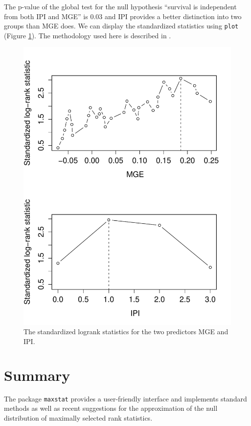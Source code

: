 \documentclass{article}
\begin{document}
The p-value of the global test for the null hypothesis ``survival is
independent from both IPI and MGE'' is 0.03 
and IPI provides a better distinction into two groups than 
MGE does. We can display the
standardized statistics using \texttt{plot} (Figure \ref{plotmmax}). The
methodology used here is described in \cite{lausenetal:2002}.

\begin{figure}[ht]
\begin{center}
\includegraphics{maxstat-mmax-fig}
\caption{The standardized logrank statistics for the two predictors MGE and
IPI. \label{plotmmax}}
\end{center}
\end{figure}

\section{Summary}

The package \texttt{maxstat} provides a user-friendly interface and 
implements standard methods as well as recent suggestions for the 
approximation of the null distribution of maximally selected rank statistics.




\end{document}
